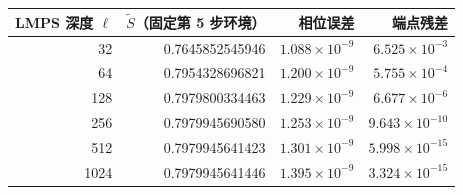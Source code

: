 \begin{tabular}{rrrr}
\toprule
LMPS 深度 $\ell$ & $\widetilde S$（固定第 5 步环境） & 相位误差 & 端点残差 \\
\midrule
32 & 0.7645852545946 & $1.088\times10^{-9}$ & $6.525\times10^{-3}$ \\
64 & 0.7954328696821 & $1.200\times10^{-9}$ & $5.755\times10^{-4}$ \\
128 & 0.7979800334463 & $1.229\times10^{-9}$ & $6.677\times10^{-6}$ \\
256 & 0.7979945690580 & $1.253\times10^{-9}$ & $9.643\times10^{-10}$ \\
512 & 0.7979945641423 & $1.301\times10^{-9}$ & $5.998\times10^{-15}$ \\
1024 & 0.7979945641446 & $1.395\times10^{-9}$ & $3.324\times10^{-15}$ \\
\bottomrule
\end{tabular}
